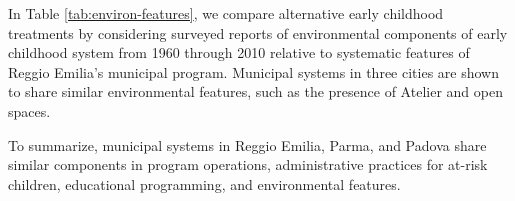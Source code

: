 In Table \ref{tab:environ-features}, we compare alternative early childhood treatments by considering surveyed reports of environmental components of early childhood system from 1960 through 2010 relative to systematic features of Reggio Emilia's municipal program. Municipal systems in three cities are shown to share similar environmental features, such as the presence of Atelier and open spaces.   
				
				
To summarize, municipal systems in Reggio Emilia, Parma, and Padova share similar components in program operations, administrative practices for at-risk children, educational programming, and environmental features. 

